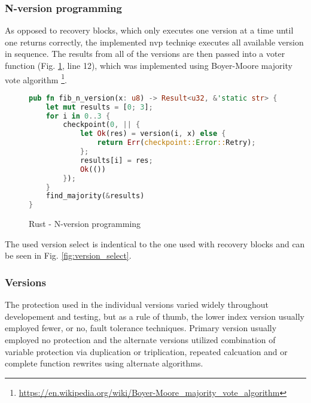 \subsubsection{N-version programming}

As opposed to recovery blocks, which only executes one version at a time until one returns correctly, the implemented \acrshort{nvp} techniqe executes all available version in sequence. The results from all of the versions are then passed into a voter function (Fig. \ref{fig:n_ver_rust}, line 12), which was implemented using Boyer-Moore majority vote algorithm \footnote{\url{https://en.wikipedia.org/wiki/Boyer-Moore_majority_vote_algorithm}}.

\begin{figure}[!h]
\begin{lstlisting}[language=Rust]
pub fn fib_n_version(x: u8) -> Result<u32, &'static str> {
    let mut results = [0; 3];
    for i in 0..3 {
        checkpoint(0, || {
            let Ok(res) = version(i, x) else {
                return Err(checkpoint::Error::Retry);
            };
            results[i] = res;
            Ok(())
        });
    }
    find_majority(&results)
}
\end{lstlisting}
\caption{Rust - N-version programming}
\label{fig:n_ver_rust}
\end{figure}

The used version select is indentical to the one used with recovery blocks and can be seen in Fig. \ref{fig:version_select}.

\subsubsection{Versions}

The protection used in the individual versions varied widely throughout developement and testing, but as a rule of thumb, the lower index version usually employed fewer, or no, fault tolerance techniques. Primary version usually employed no protection and the alternate versions utilized combination of variable protection via duplication or triplication, repeated calcuation and or complete function rewrites using alternate algorithms.

